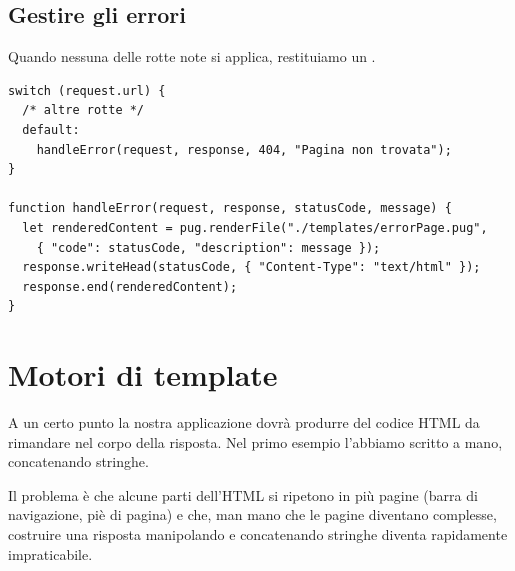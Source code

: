 \subsection{Gestire gli errori}

Quando nessuna delle rotte note si applica, restituiamo un .

\begin{lstlisting}[style=js, name=router.js]
switch (request.url) {
  /* altre rotte */
  default:
    handleError(request, response, 404, "Pagina non trovata");
}

function handleError(request, response, statusCode, message) {
  let renderedContent = pug.renderFile("./templates/errorPage.pug",
    { "code": statusCode, "description": message });
  response.writeHead(statusCode, { "Content-Type": "text/html" });
  response.end(renderedContent);
}
\end{lstlisting}


\section{Motori di template}

A un certo punto la nostra applicazione dovrà produrre del codice HTML da
rimandare nel corpo della risposta. Nel primo esempio l'abbiamo scritto a mano,
concatenando stringhe.

Il problema è che alcune parti dell'HTML si ripetono in più pagine (barra di
navigazione, piè di pagina) e che, man mano che le pagine diventano complesse,
costruire una risposta manipolando e concatenando stringhe diventa rapidamente
impraticabile.


